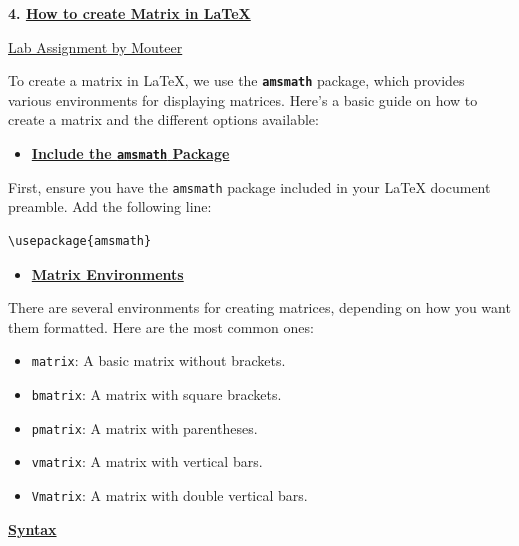 \documentclass{article}
\begin{document}
\begin{center}
    \LARGE{\textbf{4. \underline{How to create Matrix in LaTeX}}}
\end{center}
\vspace{0.2cm}
 \begin{center}
     {\underline{Lab Assignment by Mouteer}}
\end{center}
\LARGE{To create a matrix in LaTeX, we use the \texttt{\textbf{amsmath}} package, which provides various environments for displaying matrices. Here’s a basic guide on how to create a matrix and the different options available:}
\vspace{0.1cm}
\begin{center}
\begin{itemize}
    \item{\underline{\textbf{Include the \texttt{amsmath} Package}}}
\end{itemize} 
\end{center}
First, ensure you have the \texttt{amsmath} package included in your LaTeX document preamble. Add the following line:
\begin{verbatim}
\usepackage{amsmath}
\end{verbatim}
\begin{center}
    \begin{itemize}
        \item {\textbf{\underline{Matrix Environments}}}
    \end{itemize}
\end{center}
\LARGE{
There are several environments for creating matrices, depending on how you want them formatted. Here are the most common ones:}

\begin{itemize}
  \item \texttt{matrix}: A basic matrix without brackets.
  \item \texttt{bmatrix}: A matrix with square brackets.
  \item \texttt{pmatrix}: A matrix with parentheses.
  \item \texttt{vmatrix}: A matrix with vertical bars.
  \item \texttt{Vmatrix}: A matrix with double vertical bars.
\end{itemize}
\begin{center}
        \item {\textbf{\underline{\LARGE{Syntax}}}}
\end{center}
\end{document}
